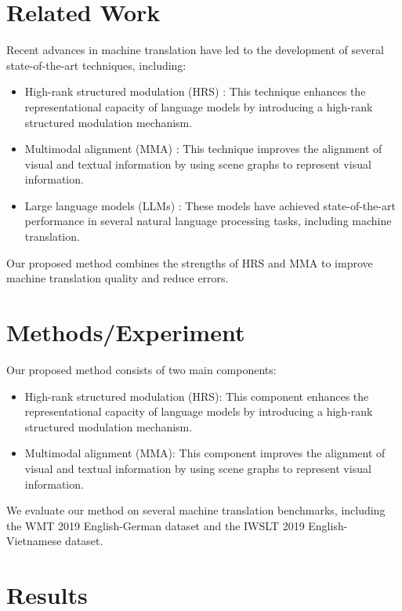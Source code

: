 \documentclass{article}
\begin{document}
\section{Related Work}

Recent advances in machine translation have led to the development of several state-of-the-art techniques, including:

\begin{itemize}
\item High-rank structured modulation (HRS) \cite{liu2026highrankstructuredmodulationparameterefficient}: This technique enhances the representational capacity of language models by introducing a high-rank structured modulation mechanism.
\item Multimodal alignment (MMA) \cite{wang2026scenealignaligningmultimodalreasoning}: This technique improves the alignment of visual and textual information by using scene graphs to represent visual information.
\item Large language models (LLMs) \cite{yadav2026awaylessneedsource}: These models have achieved state-of-the-art performance in several natural language processing tasks, including machine translation.
\end{itemize}

Our proposed method combines the strengths of HRS and MMA to improve machine translation quality and reduce errors.

\section{Methods/Experiment}

Our proposed method consists of two main components:

\begin{itemize}
\item High-rank structured modulation (HRS): This component enhances the representational capacity of language models by introducing a high-rank structured modulation mechanism.
\item Multimodal alignment (MMA): This component improves the alignment of visual and textual information by using scene graphs to represent visual information.
\end{itemize}

We evaluate our method on several machine translation benchmarks, including the WMT 2019 English-German dataset and the IWSLT 2019 English-Vietnamese dataset.

\section{Results}
\end{document}
